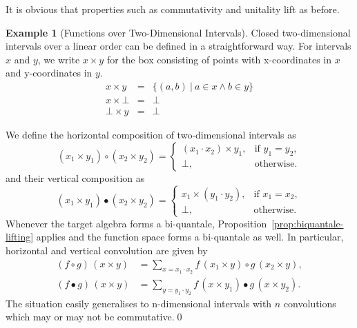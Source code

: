 \documentclass[12pt]{article}
\theoremstyle{definition}
\newtheorem{example}{Example}
\newcommand{\Rectangle}[2]{#1 \times #2}
\begin{document}
It is obvious that properties such as commutativity and unitality lift
as before.

 \begin{example}[Functions over Two-Dimensional Intervals]
   Closed two-dimensional intervals over a linear order can be
   defined in a straightforward way. 
For intervals $x$ and $y$, we write $\Rectangle{x}{y}$ for the box
   consisting of points with x-coordinates in $x$ and y-coordinates in $y$.
   \begin{eqnarray*}
     \Rectangle{x}{y} & = & \{ (a,b)\ |\ a \in x \land b \in y \} \\
     \Rectangle{x}{\bot} & = & \bot \\
     \Rectangle{\bot}{y} & = & \bot
   \end{eqnarray*}

  We define the horizontal composition of two-dimensional intervals as
  \begin{equation*}
    (\Rectangle{x_1}{y_1}) \circ (\Rectangle{x_2}{y_2}) = 
      \begin{cases}
        \Rectangle{(x_1 \cdot x_2)}{y_1}, & \text{if } y_1 = y_2, \\
        \bot,                                            & \text{otherwise}.
      \end{cases}
\end{equation*}
  and their vertical composition as
  \begin{equation*}
    (\Rectangle{x_1}{y_1}) \bullet (\Rectangle{x_2}{y_2}) = 
      \begin{cases}
        \Rectangle{x_1}{(y_1 \cdot y_2)}, & \text{if } x_1 = x_2, \\
        \bot,                                            & \text{otherwise}.
      \end{cases}
\end{equation*}
  Whenever the target algebra forms a bi-quantale,
  Proposition~\ref{prop:biquantale-lifting} applies and the function
  space forms a bi-quantale as well. In particular, horizontal and
  vertical convolution are given by
  \begin{align*}
    (f \circ g)\, (\Rectangle{x}{y}) & = \sum_{x = x_1 \cdot x_2} f\, (\Rectangle{x_1}{y}) \circ g\, (\Rectangle{x_2}{y}), \\
    (f \bullet g)\,  (\Rectangle{x}{y}) & = \sum_{y = y_1 \cdot y_2} f\, (\Rectangle{x}{y_1}) \bullet g\, (\Rectangle{x}{y_2}).
\end{align*}
  The situation easily generalises to n-dimensional intervals with $n$
  convolutions which may or may not be commutative.\qed
 \end{example}
\end{document}
